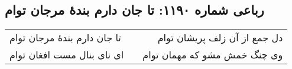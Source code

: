 \begin{center}
\section*{رباعی شماره ۱۱۹۰: تا جان دارم بندهٔ مرجان توام}
\label{sec:1190}
\begin{longtable}{l p{0.5cm} r}
تا جان دارم بندهٔ مرجان توام
&&
دل جمع از آن زلف پریشان توام
\\
ای نای بنال مست افغان توام
&&
وی چنگ خمش مشو که مهمان توام
\\
\end{longtable}
\end{center}
